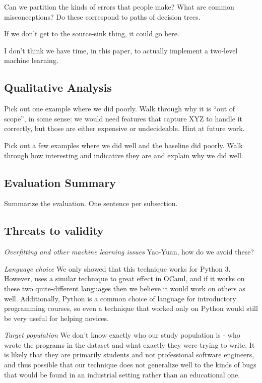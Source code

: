 \documentclass[conference]{IEEEtran}
\begin{document}
Can we partition the kinds of errors that people make? What are common
misconceptions? Do these correspond to paths of decision trees.

If we don't get to the source-sink thing, it could go here.

I don't think we have time, in this paper, to actually implement a
two-level machine learning.

\subsection{Qualitative Analysis}

Pick out one example where we did poorly. Walk through why it is ``out of
scope'', in some sense: we would need features that capture XYZ to handle
it correctly, but those are either expensive or undecideable. Hint at
future work.

Pick out a few examples where we did well and the baseline did poorly. Walk
through how interesting and indicative they are and explain why we did well.

\subsection{Evaluation Summary}

Summarize the evaluation. One sentence per subsection.

\subsection{Threats to validity}
\label{sec-threats}

\emph{Overfitting and other machine learning issues} Yao-Yuan, how do we avoid
these?

\emph{Language choice} We only showed that this technique works for Python 3.
However, \cite{learning-to-blame} uses a similar technique to great effect in
OCaml, and if it works on these two quite-different languages then we believe
it would work on others as well. Additionally, Python is a common choice of
language for introductory programming courses, so even a technique that worked
only on Python would still be very useful for helping novices.

\emph{Target population} We don't know exactly who our study population is -
who wrote the programs in the dataset and what exactly they were trying to write.
It is likely that they are primarily students and not professional software engineers,
and thus possible that our technique does not generalize well to the kinds of
bugs that would be found in an industrial setting rather than an educational one.
\end{document}
